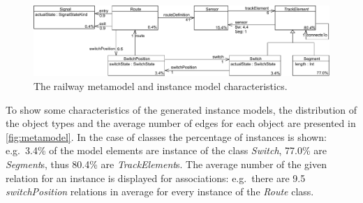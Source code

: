 \begin{figure}[htb]
\begin{center}
\includegraphics[width=\textwidth]{figures/instance/TrainMMb.pdf}
\caption{The railway metamodel and instance model characteristics.}
\label{fig:metamodel-instance-characteristics}
\end{center}
\end{figure}

To show some characteristics of the generated instance models, the distribution of the object types and the average number of edges for each object are presented in \autoref{fig:metamodel}. In the case of classes the percentage of instances is shown: e.g.\ 3.4\% of the model elements are instance of the class \emph{Switch}, 77.0\% are \emph{Segment}s, thus 80.4\% are \emph{TrackElement}s. The average number of the given relation for an instance is displayed for associations: e.g.\ there are 9.5 \emph{switchPosition} relations in average for every instance of the \emph{Route} class.
